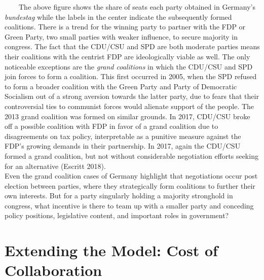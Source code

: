 \documentclass[
]{article}
\begin{document}
~~~~The above figure shows the share of seats each party obtained in
Germany's \emph{bundestag} while the labels in the center indicate the
subsequently formed coalitions. There is a trend for the winning party
to partner with the FDP or Green Party, two small parties with weaker
influence, to secure majority in congress. The fact that the CDU/CSU and
SPD are both moderate parties means their coalitions with the centrist
FDP are ideologically viable as well. The only noticeable exceptions are
the \emph{grand coalitions} in which the CDU/CSU and SPD join forces to
form a coalition. This first occurred in 2005, when the SPD refused to
form a broader coalition with the Green Party and Party of Democratic
Socialism out of a strong aversion towards the latter party, due to
fears that their controversial ties to communist forces would alienate
support of the people. The 2013 grand coalition was formed on similar
grounds. In 2017, CDU/CSU broke off a possible coalition with FDP in
favor of a grand coalition due to disagreements on tax policy,
interpretable as a punitive measure against the FDP's growing demands in
their partnership. In 2017, again the CDU/CSU formed a grand coalition,
but not without considerable negotiation efforts seeking for an
alternative (Escritt 2018).\\
\hspace*{0.333em}\hspace*{0.333em}\hspace*{0.333em}\hspace*{0.333em}Even
the grand coalition cases of Germany highlight that negotiations occur
post election between parties, where they strategically form coalitions
to further their own interests. But for a party singularly holding a
majority stronghold in congress, what incentive is there to team up with
a smaller party and conceding policy positions, legislative content, and
important roles in government?

\hypertarget{extending-the-model-cost-of-collaboration}{%
\section{Extending the Model: Cost of
Collaboration}\label{extending-the-model-cost-of-collaboration}}
\end{document}
